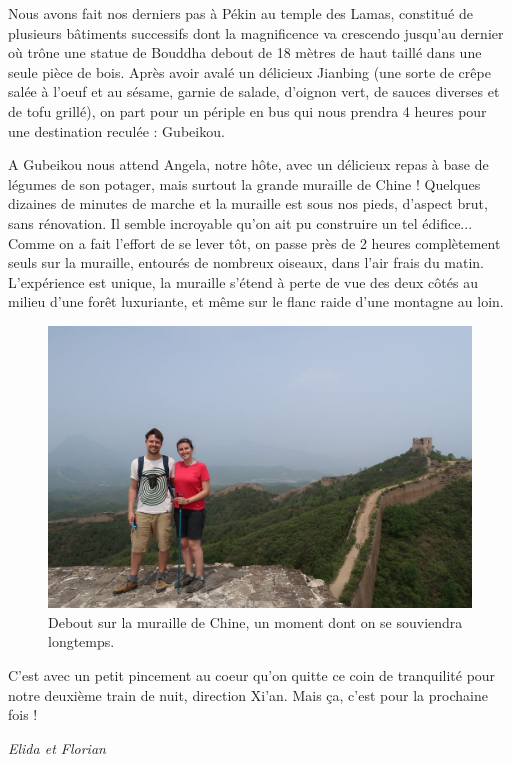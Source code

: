 Nous avons fait nos derniers pas à Pékin au temple des Lamas, constitué
de plusieurs bâtiments successifs dont la magnificence va crescendo
jusqu'au dernier où trône une statue de Bouddha debout de 18 mètres de
haut taillé dans une seule pièce de bois. Après avoir avalé un délicieux
Jianbing (une sorte de crêpe salée à l'oeuf et au sésame, garnie de
salade, d'oignon vert, de sauces diverses et de tofu grillé), on part
pour un périple en bus qui nous prendra 4 heures pour une destination
reculée : Gubeikou.

A Gubeikou nous attend Angela, notre hôte, avec un délicieux repas à
base de légumes de son potager, mais surtout la grande muraille de Chine
! Quelques dizaines de minutes de marche et la muraille est sous nos
pieds, d'aspect brut, sans rénovation. Il semble incroyable qu'on ait pu
construire un tel édifice... Comme on a fait l'effort de se lever tôt,
on passe près de 2 heures complètement seuls sur la muraille, entourés
de nombreux oiseaux, dans l'air frais du matin. L'expérience est unique,
la muraille s'étend à perte de vue des deux côtés au milieu d'une forêt
luxuriante, et même sur le flanc raide d'une montagne au loin.

\begin{figure}
\centering
\includegraphics{images/20180616_muraille.JPG}
\caption{Debout sur la muraille de Chine, un moment dont on se
souviendra longtemps.}
\end{figure}

C'est avec un petit pincement au coeur qu'on quitte ce coin de
tranquilité pour notre deuxième train de nuit, direction Xi'an. Mais ça,
c'est pour la prochaine fois !

\emph{Elida et Florian}


